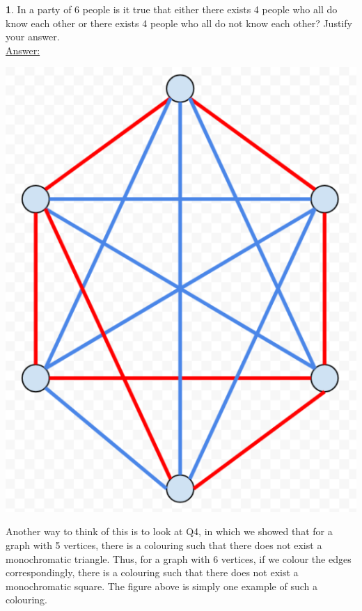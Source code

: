 \documentclass[12pt,a4paper]{article}
\theoremstyle{definition}
\newtheorem{problem}{}
\begin{document}
\begin{problem}
In a party of 6 people is it true that  either there exists 4 people  who all do know each other or there exists 4 people who all do not know each other? Justify your answer. \\

\underline{Answer:} \\
\centerline{\includegraphics[scale=0.4]{q5.png}}

Another way to think of this is to look at Q4, in which we showed that for a graph with 5 vertices, there is a colouring such that there does not exist a monochromatic triangle. Thus, for a graph with 6 vertices, if we colour the edges correspondingly, there is a colouring such that there does not exist a monochromatic square. The figure above is simply one example of such a colouring.

\end{problem}
\end{document}

